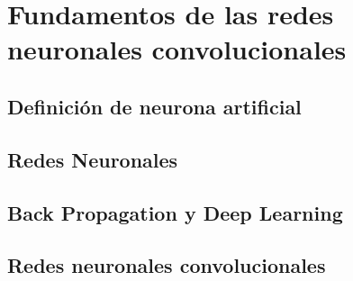 \section{Fundamentos de las redes neuronales convolucionales}

\subsection{Definición de neurona artificial}
\subsection{Redes Neuronales}
\subsection{Back Propagation y Deep Learning}
\subsection{Redes neuronales convolucionales}
